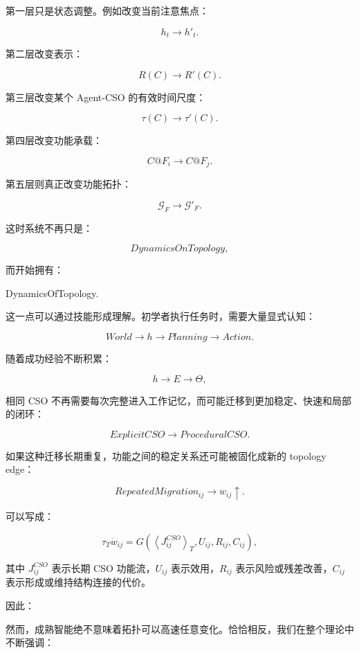 第一层只是状态调整。例如改变当前注意焦点：

\[
h_t
\rightarrow
h'_t.
\]

第二层改变表示：

\[
R(C)
\rightarrow
R'(C).
\]

第三层改变某个 Agent-CSO 的有效时间尺度：

\[
\tau(C)
\rightarrow
\tau'(C).
\]

第四层改变功能承载：

\[
C@F_i
\rightarrow
C@F_j.
\]

第五层则真正改变功能拓扑：

\[
\mathcal G_F
\rightarrow
\mathcal G'_F.
\]

这时系统不再只是：

\[
DynamicsOnTopology,
\]

而开始拥有：

\begin{statementbox}
DynamicsOfTopology.
\end{statementbox}

这一点可以通过技能形成理解。初学者执行任务时，需要大量显式认知：

\[
World
\rightarrow
h
\rightarrow
Planning
\rightarrow
Action.
\]

随着成功经验不断积累：

\[
h
\rightarrow
E
\rightarrow
\Theta,
\]

相同 CSO 不再需要每次完整进入工作记忆，而可能迁移到更加稳定、快速和局部的闭环：

\[
ExplicitCSO
\rightarrow
ProceduralCSO.
\]

如果这种迁移长期重复，功能之间的稳定关系还可能被固化成新的 topology edge：

\[
RepeatedMigration_{ij}
\rightarrow
w_{ij}\uparrow.
\]

可以写成：

\[
\tau_T
\dot w_{ij}
=
G
\left(
\left\langle
J^{CSO}_{ij}
\right\rangle_T,
U_{ij},
R_{ij},
C_{ij}
\right),
\]

其中 \(J^{CSO}_{ij}\) 表示长期 CSO 功能流，\(U_{ij}\) 表示效用，\(R_{ij}\) 表示风险或残差改善，\(C_{ij}\) 表示形成或维持结构连接的代价。

因此：

\begin{statementbox}
\centering
{}
\end{statementbox}

然而，成熟智能绝不意味着拓扑可以高速任意变化。恰恰相反，我们在整个理论中不断强调：

